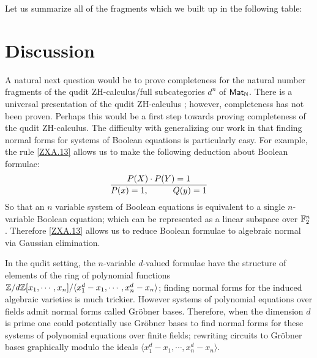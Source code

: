 
Let us summarize all of the fragments which we built up in the following table:


\section{Discussion}

A natural next question would be to prove completeness for the natural number fragments of the qudit ZH-calculus/full subcategories $d^n$ of $\mathsf{Mat}_{\mathbb{N}}$.  There is a universal presentation of the qudit ZH-calculus \cite{roy}; however, completeness has not been proven.  Perhaps this would be a first step towards proving completeness of the qudit ZH-calculus.  The difficulty with generalizing our work in that finding normal forms for systems of Boolean equations is particularly easy.  For example, the rule \ref{ZXA.13} allows us to make the following deduction about Boolean formulae:
$$
\dfrac{P(X)\cdot P(Y)=1}{P(x)=1,\hspace*{1cm}Q(y)=1}
$$
So that an $n$ variable system of Boolean equations is equivalent to a single $n$-variable Boolean equation; which can be represented as a linear subspace over $\mathbb{F}_2^n$. Therefore \ref{ZXA.13} allows us to  reduce Boolean formulae to algebraic normal via  Gaussian elimination.
 
In the qudit setting, the $n$-variable $d$-valued formulae have the structure of elements of the ring of polynomial functions $\mathbb{Z}/d\mathbb{Z}[x_1,\cdots, x_{n}]/\langle x_1^d-x_1,\cdots, x_n^d-x_n\rangle$; finding normal forms for the induced algebraic varieties is much trickier. 
However systems of polynomial equations over fields admit normal forms called Gr\"obner bases.  Therefore,  when the dimension $d$ is prime one could potentially use  Gr\"obner bases to find normal forms for these systems of polynomial equations over finite fields; rewriting circuits to    Gr\"obner bases  graphically modulo the  ideals $\langle x_1^d-x_1,\cdots, x_n^d-x_n\rangle$.  
